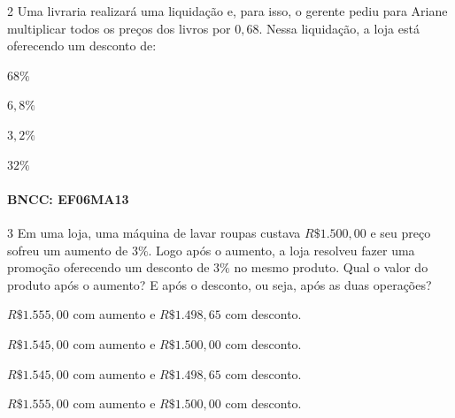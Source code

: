 {\num{2}  Uma livraria realizará uma liquidação e, para isso, o gerente pediu
para Ariane multiplicar todos os preços dos livros por $0,68$. Nessa
liquidação, a loja está oferecendo um desconto de:

\begin{escolha}
\item $68\%$
\item $6,8\%$
\item $3,2\%$
\item $32\%$
\end{escolha}

\paragraph{BNCC: EF06MA13 }


\num{3}  Em uma loja, uma máquina de lavar roupas custava $R\$1.500,00$ e seu
preço sofreu um aumento de $3\%$. Logo após o aumento, a loja resolveu
fazer uma promoção oferecendo um desconto de $3\%$ no mesmo produto. Qual
o valor do produto após o aumento? E após o desconto, ou seja, após as
duas operações?

\begin{escolha}
\item $R\$1.555,00$ com aumento e $R\$1.498,65$ com desconto.
\item $R\$1.545,00$ com aumento e $R\$1.500,00$ com desconto.
\item $R\$1.545,00$ com aumento e $R\$1.498,65$ com desconto.
\item $R\$1.555,00$ com aumento e $R\$1.500,00$ com desconto.
\end{escolha}

}
